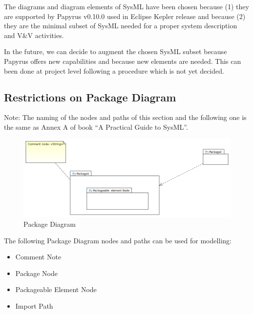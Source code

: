 The diagrams and diagram elements of SysML have been chosen because
(1) they are supported by Papyrus v0.10.0 used in Eclipse Kepler
release and because (2) they are the minimal subset of SysML needed
for a proper system description and V\&V activities.

In the future, we can decide to augment the chosen SysML subset
because Papyrus offers new capabilities and because new elements are
needed. This can been done at project level following a procedure
which is not yet decided.

\subsection{Restrictions on Package Diagram}

Note: The naming of the nodes and paths of this section and the
following one is the same as Annex A of book ``A Practical Guide to
SysML''.


\begin{figure}[ht]
  \centering
  \includegraphics[width=\textwidth]{images/PackageDiagram.PNG}
  \caption{Package Diagram}
  \label{fig:package diagram}
\end{figure}


The following Package Diagram nodes and paths can be used for
modelling:
\begin{itemize}
\item Comment Note 
\item Package Node 
\item Packageable Element Node
\item Import Path 
\end{itemize}


